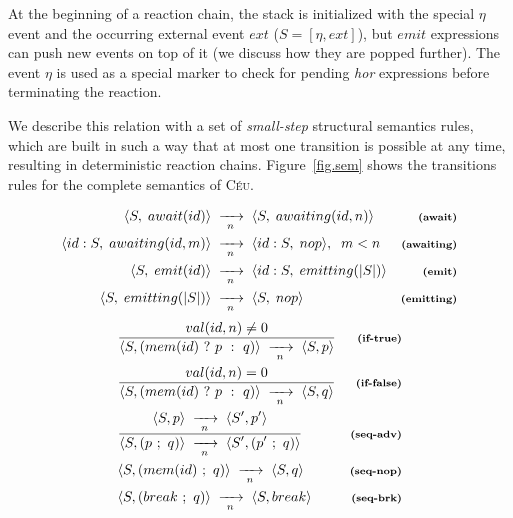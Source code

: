 \documentclass{acm_proc_article-sp}
\newcommand{\CEU}{\textsc{C\'{e}u}\xspace}
\newcommand{\ST}{\1\xrightarrow[~n~]{}\1}
\newcommand{\LL}{\langle}
\newcommand{\RR}{\rangle}
\newcommand{\DS}{\displaystyle}
\newcommand{\rr}[1] {{\textbf{\scriptsize{#1}}}}
\newcommand{\1}{\;}
\newcommand{\2}{\;\;}
\newcommand{\3}{\;\;\;}
\newcommand{\5}{\;\;\;\;\;}
\begin{document}
At the beginning of a reaction chain, the stack is initialized with the special 
$\eta$ event and the occurring external event $ext$ ($S=[\eta,ext]$), but 
$emit$ expressions can push new events on top of it (we discuss how they are 
popped further).
%
The event $\eta$ is used as a special marker to check for pending \emph{hor} 
expressions before terminating the reaction.

We describe this relation with a set of \emph{small-step} structural semantics 
rules, which are built in such a way that at most one transition is possible at 
any time, resulting in deterministic reaction chains.
%
Figure~\ref{fig.sem} shows the transitions rules for the complete semantics of 
\CEU.

\begin{figure}
%
{ \setlength{\jot}{7pt}
\begin{align*}
\LL S,\1await(id) \RR &\ST
\LL S,\1awaiting(id,n) \RR
    & \rr{(await)}      \\
\LL id:S,\1awaiting(id,m) \RR &\ST
\LL id:S,\1nop \RR, \2m<n
    & \rr{(awaiting)}   \\
\LL S,\1emit(id) \RR &\ST
\LL id:S,\1emitting(|S|) \RR
    & \rr{(emit)}       \\
\LL S,\1emitting(|S|) \RR &\ST
\LL S,\1nop \RR
    & \rr{(emitting)}
\end{align*}
}
%
{ %
\begin{eqnarray*}
& \frac
    { \DS val(id,n) \neq 0 }
    { \DS \LL S, (mem(id)~?~p~:~q) \RR \ST
          \LL S, p \RR }
    & \rr{(if-true)}       \\
& \frac
    { \DS val(id,n) = 0 }
    { \DS \LL S, (mem(id)~?~p~:~q) \RR \ST
          \LL S, q \RR }
    & \rr{(if-false)}       \\
& \frac
    {\DS \LL S,p \RR \ST \LL S',p' \RR }
    {\DS \LL S, (p~;~q) \RR \ST \LL S', (p'~;~q) \RR }
    & \rr{(seq-adv)}        \\
& \LL S, (mem(id)~;~q) \RR \ST  \LL S, q \RR
    & \rr{(seq-nop)}        \\
& \LL S, (break~;~q) \RR \ST \LL S, break \RR
    & \rr{(seq-brk)}        \\
%

\end{eqnarray*}}
\end{figure}
\end{document}
